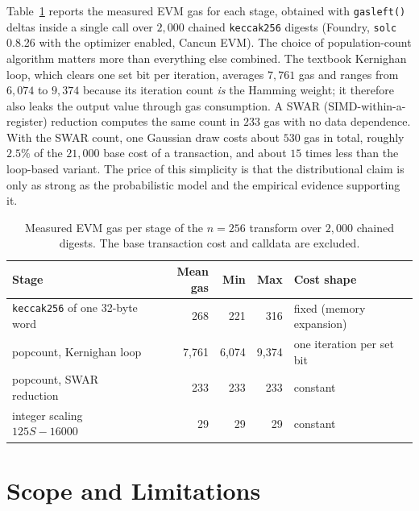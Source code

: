 \documentclass[11pt]{article}
\begin{document}
Table~\ref{tab:gas} reports the measured EVM gas for each stage, obtained with
\texttt{gasleft()} deltas inside a single call over $2{,}000$ chained
\texttt{keccak256} digests (Foundry, \texttt{solc} 0.8.26 with the optimizer
enabled, Cancun EVM). The choice of population-count algorithm matters more
than everything else combined. The textbook Kernighan loop, which clears one
set bit per iteration, averages $7{,}761$ gas and ranges from $6{,}074$ to
$9{,}374$ because its iteration count \emph{is} the Hamming weight; it
therefore also leaks the output value through gas consumption. A SWAR
(SIMD-within-a-register) reduction computes the same count in $233$ gas with
no data dependence. With the SWAR count, one Gaussian draw costs about $530$
gas in total, roughly $2.5\%$ of the $21{,}000$ base cost of a transaction,
and about $15$ times less than the loop-based variant. The price of this
simplicity is that the distributional claim is only as strong as the
probabilistic model and the empirical evidence supporting it.

\begin{table}[htbp]
\centering
\small
\begin{tabular}{lrrrl}
\hline
Stage & Mean gas & Min & Max & Cost shape \\
\hline
\texttt{keccak256} of one 32-byte word & 268 & 221 & 316 & fixed (memory expansion) \\
popcount, Kernighan loop & 7,761 & 6,074 & 9,374 & one iteration per set bit \\
popcount, SWAR reduction & 233 & 233 & 233 & constant \\
integer scaling $125S-16000$ & 29 & 29 & 29 & constant \\
\hline
\end{tabular}
\caption{Measured EVM gas per stage of the $n=256$ transform over $2{,}000$
chained digests. The base transaction cost and calldata are excluded.}
\label{tab:gas}
\end{table}

\begin{table}[htbp]
\centering
\small

\caption{Summary diagnostics across the six one-shot experiments.}
\label{tab:summary}
\end{table}

\section{Scope and Limitations}
\end{document}
